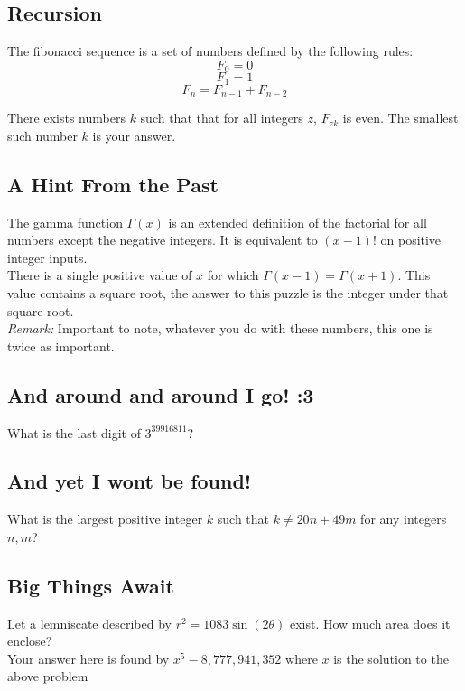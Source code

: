 \documentclass{article}
\begin{document}
\subsection{Recursion}
The fibonacci sequence is a set of numbers defined by the following rules:
\[F_0=0\]
\[F_1=1\]
\[F_n=F_{n-1} + F_{n-2}\]

There exists numbers $k$ such that that for all integers $z$, $F_{zk}$ is even. The smallest such number $k$ is your answer.\\

\subsection{A Hint From the Past}
The gamma function $\Gamma(x)$ is an extended definition of the factorial for all numbers except the negative integers. It is equivalent to $(x-1)!$ on positive integer inputs.\\

There is a single positive value of $x$ for which $\Gamma(x-1)=\Gamma(x+1)$. This value contains a square root, the answer to this puzzle is the integer under that square root.\\

\textit{Remark:} Important to note, whatever you do with these numbers, this one is twice as important.\\

\subsection{And around and around I go! :3}
What is the last digit of $3^{39916811}$?\\

\subsection{And yet I wont be found!}
What is the largest positive integer $k$ such that $k\neq20n+49m$ for any integers $n,m$?

\subsection{Big Things Await}
Let a lemniscate described by $r^2=1083\sin(2\theta)$ exist. How much area does it enclose?\\

Your answer here is found by $x^5 - 8,777,941,352$ where $x$ is the solution to the above problem\\
\end{document}
